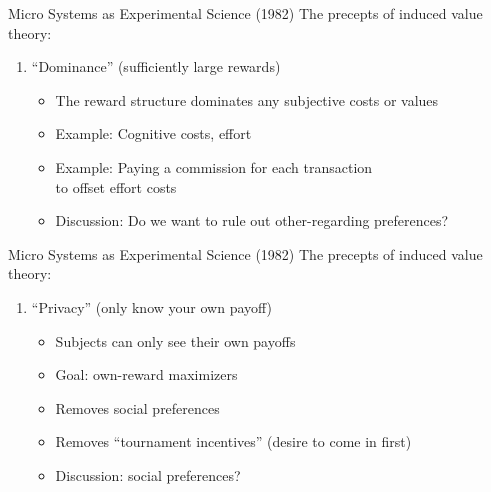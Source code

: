 \begin{frame}{Micro Systems as Experimental Science (1982)}
    The precepts of induced value theory:
    \begin{enumerate}
        \conti
        \item ``Dominance'' (sufficiently large rewards)
        \begin{itemize}
            \item The reward structure dominates any subjective costs or values
            \item Example: Cognitive costs, effort
            \item Example: Paying a commission for each transaction\\
            to offset effort costs
            \item Discussion: Do we want to rule out other-regarding preferences?
        \end{itemize}
        \seti
    \end{enumerate}
\end{frame}

\begin{frame}{Micro Systems as Experimental Science (1982)}
    The precepts of induced value theory:
    \begin{enumerate}
        \conti
        \item ``Privacy'' (only know your own payoff)
        \begin{itemize}
            \item Subjects can only see their own payoffs
            \item Goal: own-reward maximizers
            \item Removes social preferences
            \item Removes ``tournament incentives'' (desire to come in first)
            \item Discussion: social preferences?
        \end{itemize}
        \seti
    \end{enumerate}
\end{frame}

